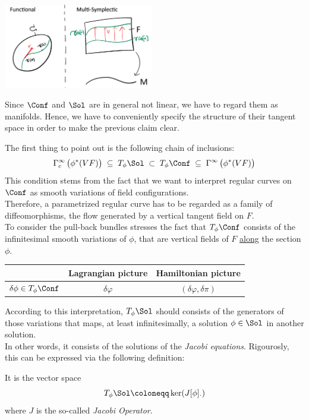 \documentclass[a4paper,12pt,fleqn]{scrartcl}  %
\begin{document}
\begin{center}
\includegraphics[width=0.49\textwidth]{Pictures/variations.png}
\end{center}

Since $\Conf$ and $\Sol$ are in general not linear, we have to regard them as manifolds.
Hence, we have to conveniently specify the structure of their tangent space in order to make the previous claim clear.

The first thing to point out is the following chain of inclusions:
\begin{displaymath}
	\Gamma^\infty_c\left(\phi^*(VF)\right) \; \subseteq \; T_\phi\Sol \; \subset \; T_\phi\Conf \; \subseteq \; \Gamma^\infty\left( \phi^\ast (VF) \right)
\end{displaymath}
%
This condition stems from the fact that we want to interpret regular curves on $\Conf$ as smooth variations of field configurations. \\
Therefore, a parametrized regular curve has to be regarded as a family of diffeomorphisms, the flow generated by a vertical tangent field on $F$.\\
To consider the pull-back bundles stresses the fact that $T_\phi \Conf$ consists of the infinitesimal smooth variations of $\phi$, that are vertical fields of $F$ \underline{along} the section $\phi$.
\begin{notation}
	\begin{center}
		\begin{tabular}{|c|c|c|}
			\hline
			 & Lagrangian picture & Hamiltonian picture \\
			\hline
			$\delta \phi \in T_\phi \Conf$		&	$\delta \varphi$		&	$(\delta \varphi, \delta \pi)$ \\
			\hline
		\end{tabular}
	\end{center}
\end{notation}

According to this interpretation, $T_\phi\Sol$ should consists of the generators of those variations that maps, at least infinitesimally, a solution $\phi\in\Sol$ in another solution.\\
In other words, it consists of the solutions of the \emph{Jacobi equations}.
Rigourosly, this can be expressed via the following definition:
	\begin{definition}\label{Def:TangentSol}
		It is the vector space
		\begin{displaymath}
			T_\phi \Sol \coloneqq \ker(J[\phi]_\cdot)
		\end{displaymath}
		where $J$ is the so-called \emph{Jacobi Operator}.
	\end{definition}
\end{document}
